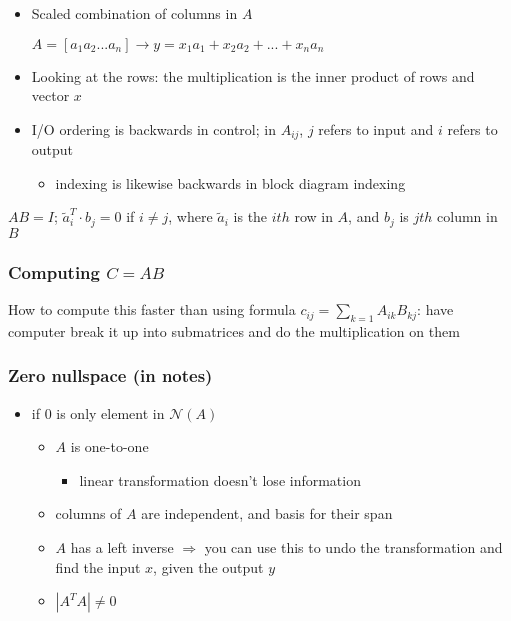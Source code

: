 \documentclass[10pt,letterpaper]{article}
\begin{document}
\begin{itemize}
\item Scaled combination of columns in $A$

  $A=[ a_1 a_{2} ... a_{n}] \rightarrow y=x_{1}a_{1}+x_{2}a_{2}+...+x_{n}a_{n}$
\item Looking at the rows: the multiplication is the inner product of rows and vector $x$
\item I/O ordering is backwards in control; in $A_{ij}$, $j$ refers to input and $i$ refers to output

\begin{itemize}
\item indexing is likewise backwards in block diagram indexing
\end{itemize}

\end{itemize}
  $AB=I$; $\tilde a_{i}^{T} \cdot b_{j}=0$ if $i\ne j$, where $\tilde a_{i}$ is the $ith$ row in $A$, and $b_{j}$ is $jth$ column in $B$ 
\subsubsection{Computing $C=AB$}
\label{sec-2_2_1}

How to compute this faster than using formula $c_{ij}=\sum_{k=1} A_{ik} B_{kj}$: have computer break it up into submatrices and do the multiplication on them
\subsubsection{Zero nullspace (in notes)}
\label{sec-2_2_2}

\begin{itemize}
\item if 0 is only element in $\mathcal{N}(A)$

\begin{itemize}
\item $A$ is one-to-one

\begin{itemize}
\item linear transformation doesn't lose information
\end{itemize}

\item columns of $A$ are independent, and basis for their span
\item $A$ has a left inverse $\Rightarrow$ you can use this to undo the transformation and find the input $x$, given the output $y$
\item $|A^T A|\ne0$
\end{itemize}

\end{itemize}
\end{document}
